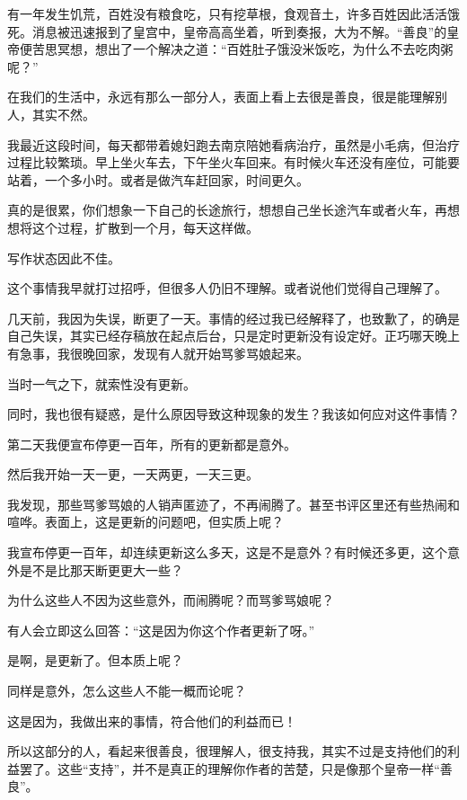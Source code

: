 \begin{this_body} \par
有一年发生饥荒，百姓没有粮食吃，只有挖草根，食观音土，许多百姓因此活活饿死。消息被迅速报到了皇宫中，皇帝高高坐着，听到奏报，大为不解。“善良”的皇帝便苦思冥想，想出了一个解决之道：“百姓肚子饿没米饭吃，为什么不去吃肉粥呢？”

在我们的生活中，永远有那么一部分人，表面上看上去很是善良，很是能理解别人，其实不然。

我最近这段时间，每天都带着媳妇跑去南京陪她看病治疗，虽然是小毛病，但治疗过程比较繁琐。早上坐火车去，下午坐火车回来。有时候火车还没有座位，可能要站着，一个多小时。或者是做汽车赶回家，时间更久。

真的是很累，你们想象一下自己的长途旅行，想想自己坐长途汽车或者火车，再想想将这个过程，扩散到一个月，每天这样做。

写作状态因此不佳。

这个事情我早就打过招呼，但很多人仍旧不理解。或者说他们觉得自己理解了。

几天前，我因为失误，断更了一天。事情的经过我已经解释了，也致歉了，的确是自己失误，其实已经存稿放在起点后台，只是定时更新没有设定好。正巧哪天晚上有急事，我很晚回家，发现有人就开始骂爹骂娘起来。

当时一气之下，就索性没有更新。

同时，我也很有疑惑，是什么原因导致这种现象的发生？我该如何应对这件事情？

第二天我便宣布停更一百年，所有的更新都是意外。

然后我开始一天一更，一天两更，一天三更。

我发现，那些骂爹骂娘的人销声匿迹了，不再闹腾了。甚至书评区里还有些热闹和喧哗。表面上，这是更新的问题吧，但实质上呢？

我宣布停更一百年，却连续更新这么多天，这是不是意外？有时候还多更，这个意外是不是比那天断更更大一些？

为什么这些人不因为这些意外，而闹腾呢？而骂爹骂娘呢？

有人会立即这么回答：“这是因为你这个作者更新了呀。”

是啊，是更新了。但本质上呢？

同样是意外，怎么这些人不能一概而论呢？

这是因为，我做出来的事情，符合他们的利益而已！

所以这部分的人，看起来很善良，很理解人，很支持我，其实不过是支持他们的利益罢了。这些“支持”，并不是真正的理解你作者的苦楚，只是像那个皇帝一样“善良”。


\end{this_body}
